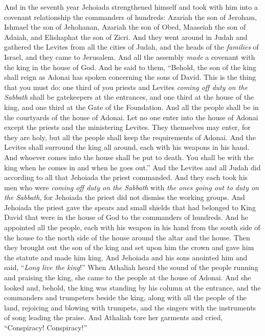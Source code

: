 \begin{biblechapter} %
 And in the seventh year Jehoiada strengthened himself and took with him into a covenant relationship the commanders of hundreds: Azariah the son of Jeroham, Ishmael the son of Jehohanan, Azariah the son of Obed, Maaseiah the son of Adaiah, and Elishaphat the son of Zicri.
\verse And they went around in Judah and gathered the Levites from all the cities of Judah, and the heads of the \textit{families} of Israel, and they came to Jerusalem.
\verse And all the assembly \textit{made} a covenant with the king in the house of God. And he said to them, “Behold, the son of the king shall reign as Adonai has spoken concerning the sons of David.
\verse This is the thing that you must do: one third of you priests and Levites \textit{coming off duty on the Sabbath} shall be gatekeepers at the entrances,
\verse and one third at the house of the king, and one third at the Gate of the Foundation. And all the people shall be in the courtyards of the house of Adonai.
\verse Let no one enter into the house of Adonai except the priests and the ministering Levites. They themselves may enter, for they are holy, but all the people shall keep the requirements of Adonai.
\verse And the Levites shall surround the king all around, each with his weapons in his hand. And whoever comes into the house shall be put to death. You shall be with the king when he comes in and when he goes out.”
\verse And the Levites and all Judah did according to all that Jehoiada the priest commanded. And they each took his men who were \textit{coming off duty on the Sabbath} with \textit{the ones going out to duty on the Sabbath}, for Jehoiada the priest did not dismiss the working groups.
\verse And Jehoiada the priest gave the spears and small shields that had belonged to King David that were in the house of God to the commanders of hundreds.
\verse And he appointed all the people, each with his weapon in his hand from the south side of the house to the north side of the house around the altar and the house.
\verse Then they brought out the son of the king and set upon him the crown and gave him the statute and made him king. And Jehoiada and his sons anointed him and said, “\textit{Long live the king}!”
\verse When Athaliah heard the sound of the people running and praising the king, she came to the people at the house of Adonai.
\verse And she looked and, behold, the king was standing by his column at the entrance, and the commanders and trumpeters beside the king, along with all the people of the land, rejoicing and blowing with trumpets, and the singers with the instruments of song leading the praise. And Athaliah tore her garments and cried, “Conspiracy! Conspiracy!”

\end{biblechapter}

